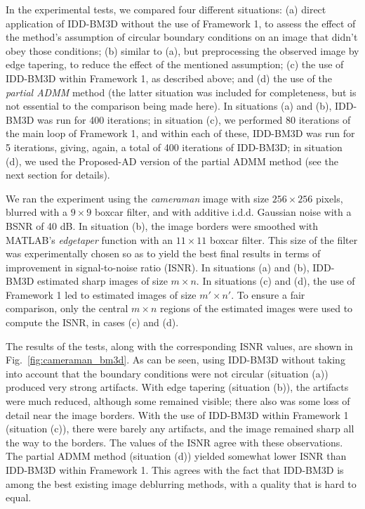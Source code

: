 \documentclass[10pt,twocolumn,twoside]{IEEEtran}
\begin{document}
In the experimental tests, we compared four different situations: (a) direct application of IDD-BM3D without the use of Framework 1, to assess the effect of the method's assumption of circular boundary conditions on an image that didn't obey those conditions; (b) similar to (a), but preprocessing the observed image by edge tapering, to reduce the effect of the mentioned assumption; (c) the use of IDD-BM3D within Framework 1, as described above; and (d) the use of the \emph{partial ADMM} method (the latter situation was included for completeness, but is not essential to the comparison being made here). In situations (a) and (b), IDD-BM3D was run for 400 iterations; in situation (c), we performed 80 iterations of the main loop of Framework 1, and within each of these, IDD-BM3D was run for 5 iterations, giving, again, a total of 400 iterations of IDD-BM3D; in situation (d), we used the Proposed-AD version of the partial ADMM method (see the next section for details).

We ran the experiment using the \emph{cameraman} image with size $256 \times 256$ pixels, blurred with a $9 \times 9$ boxcar filter, and with additive i.d.d. Gaussian noise with a BSNR of 40 dB. In situation (b), the image borders were smoothed with MATLAB's \emph{edgetaper} function with an $11 \times 11$ boxcar filter. This size of the filter was experimentally chosen so as to yield the best final results in terms of improvement in signal-to-noise ratio (ISNR). In situations (a) and (b), IDD-BM3D estimated sharp images of size $m \times n$. In situations (c) and (d), the use of Framework 1 led to estimated images of size $m' \times n'$. To ensure a fair comparison, only the central $m \times n$ regions of the estimated images were used to compute the ISNR, in cases (c) and (d).

The results of the tests, along with the corresponding ISNR values, are shown in Fig.~\ref{fig:cameraman_bm3d}. As can be seen, using IDD-BM3D without taking into account that the boundary conditions were not circular (situation (a)) produced very strong artifacts. With edge tapering (situation (b)), the artifacts were much reduced, although some remained visible; there also was some loss of detail near the image borders. With the use of IDD-BM3D within Framework 1 (situation (c)), there were barely any artifacts, and the image remained sharp all the way to the borders. The values of the ISNR agree with these observations. The partial ADMM method (situation (d)) yielded somewhat lower ISNR than IDD-BM3D within Framework 1. This agrees with the fact that IDD-BM3D is among the best existing image deblurring methods, with a quality that is hard to equal.
\end{document}
